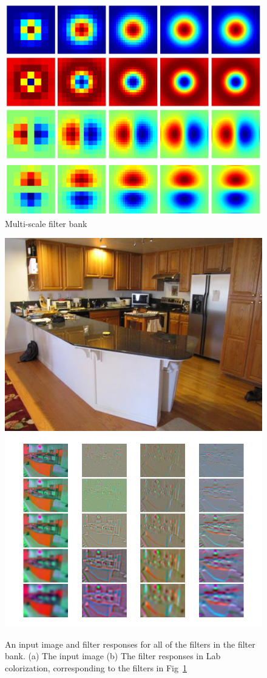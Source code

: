 \documentclass[10pt]{article}
\begin{document}
\begin{figure}
\centering
\includegraphics[width=.5\textwidth]{figures/filters.pdf}
\caption{Multi-scale filter bank}
\label{fig:fb}
\end{figure}

\begin{figure}[h]
  \centering
  \includegraphics[width=.5\textwidth]{./figures/example_filter.jpg}
  \includegraphics[width=.6\textwidth]{./figures/filters.png}
  \caption{An input image and filter responses for all of the filters in the filter bank. (a) The input image 
    (b) The filter responses in Lab colorization, corresponding to the filters in Fig~\ref{fig:fb}}
  \label{fig:filter_resp}
\end{figure}

\end{document}
